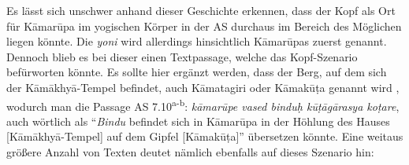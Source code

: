 \documentclass[a4paper,12pt]{article}
\begin{document}
Es lässt sich unschwer anhand dieser Geschichte erkennen, dass der Kopf als Ort für Kāmarūpa im yogischen Körper in der AS durchaus im Bereich des Möglichen liegen könnte. Die \textit{yoni} wird allerdings hinsichtlich Kāmarūpas zuerst genannt. Dennoch blieb es bei dieser einen Textpassage, welche das Kopf-Szenario befürworten könnte. Es sollte hier ergänzt werden, dass der Berg, auf dem sich der Kāmākhyā-Tempel befindet, auch Kāmatagiri oder Kāmakūṭa genannt wird \parencite[38]{urban2010}, wodurch man die Passage AS 7.10\textsuperscript{a-b}: \textit{kāmarūpe vased binduḥ kūṭāgārasya koṭare}, auch wörtlich als ``\textit{Bindu} befindet sich in Kāmarūpa in der Höhlung des Hauses [Kāmākhyā-Tempel] auf dem Gipfel [Kāmakūṭa]'' übersetzen könnte. Eine weitaus größere Anzahl von Texten deutet nämlich ebenfalls auf dieses Szenario hin:
\end{document}
